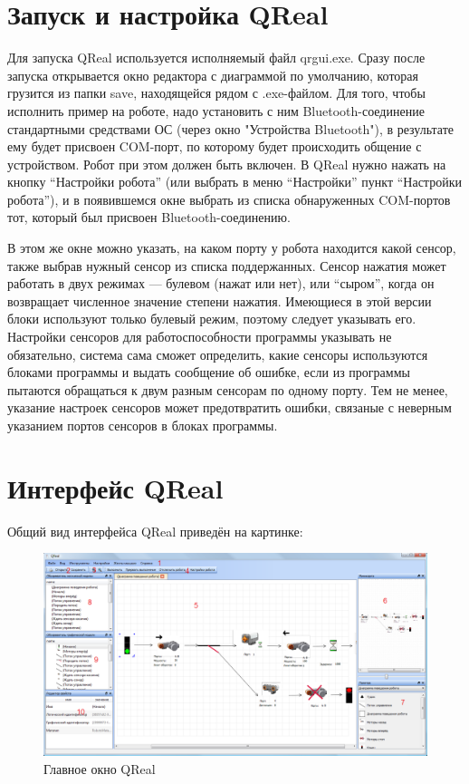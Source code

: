 \documentclass[a4paper,12pt,twoside]{article}
\begin{document}
\section{Запуск и настройка QReal}

Для запуска QReal используется исполняемый файл qrgui.exe. Сразу после запуска открывается окно редактора с диаграммой по умолчанию, которая грузится из папки save, находящейся рядом с .exe-файлом. Для того, чтобы исполнить пример на роботе, надо установить с ним Bluetooth-соединение стандартными средствами ОС (через окно "Устройства Bluetooth"), в результате ему будет присвоен COM-порт, по которому будет происходить общение с устройством. Робот при этом должен быть включен. В QReal нужно нажать на кнопку "`Настройки робота"' (или выбрать в меню "`Настройки"' пункт "`Настройки робота"'), и в появившемся окне выбрать из списка обнаруженных COM-портов тот, который был присвоен Bluetooth-соединению. 

В этом же окне можно указать, на каком порту у робота находится какой сенсор, также выбрав нужный сенсор из списка поддержанных. Сенсор нажатия может работать в двух режимах --- булевом (нажат или нет), или "`сыром"', когда он возвращает численное значение степени нажатия. Имеющиеся в этой версии блоки используют только булевый режим, поэтому следует указывать его. Настройки сенсоров для работоспособности программы указывать не обязательно, система сама сможет определить, какие сенсоры используются блоками программы и выдать сообщение об ошибке, если из программы пытаются обращаться к двум разным сенсорам по одному порту. Тем не менее, указание настроек сенсоров может предотвратить ошибки, связаные с неверным указанием портов сенсоров в блоках программы.

\section{Интерфейс QReal}

Общий вид интерфейса QReal приведён на картинке:

\begin{figure}[ht]
	\begin{center}
		\includegraphics[width=1.00\textwidth]{Interface.png}
    \caption{Главное окно QReal}
    \label{fig:Interface}
  \end{center}
\end{figure}
\end{document}
